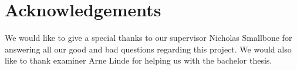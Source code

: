 \thispagestyle{plain}			%
\section*{Acknowledgements}
We would like to give a special thanks to our supervisor Nicholas Smallbone for
answering all our good and bad questions regarding this project. We would also
like to thank examiner Arne Linde for helping us with the bachelor thesis.


\newpage				%
\thispagestyle{empty}
\mbox{}
